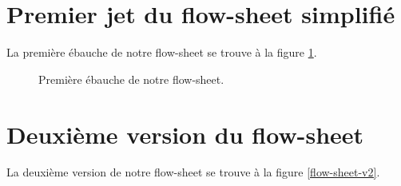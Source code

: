 
\newpage
\annexe
\section{Premier jet du flow-sheet simplifié}
La première ébauche de notre flow-sheet se trouve à la figure \ref{flow-sheet}.

\begin{figure}[htb!]
	\centering
	\caption{Première ébauche de notre flow-sheet.}
	\label{flow-sheet}
\end{figure}
\newpage

\section{Deuxième version du flow-sheet}
\label{appendix:flow-sheet}
La deuxième version de notre flow-sheet se trouve à la figure \ref{flow-sheet-v2}.

